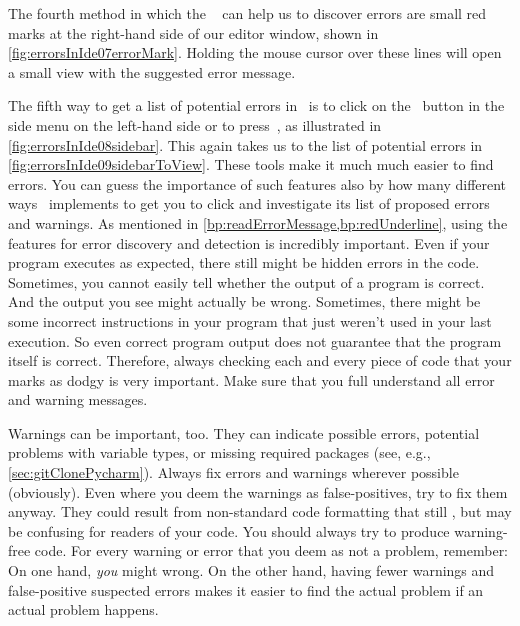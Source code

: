 The fourth method in which the \pycharm\  can help us to discover errors are small red marks at the right-hand side of our editor window, shown in \cref{fig:errorsInIde07errorMark}.
Holding the mouse cursor over these lines will open a small view with the suggested error message.

The fifth way to get a list of potential errors in \pycharm\ is to click on the \pycharmErrorsButton~button in the side menu on the left-hand side or to press~, as illustrated in \cref{fig:errorsInIde08sidebar}.
This again takes us to the list of potential errors in \cref{fig:errorsInIde09sidebarToView}.
%
%
%
These tools make it much much easier to find errors.
You can guess the importance of such features also by how many different ways \pycharm\ implements to get you to click and investigate its list of proposed errors and warnings.
As mentioned in \cref{bp:readErrorMessage,bp:redUnderline}, using the  features for error discovery and detection is incredibly important.
Even if your program executes as expected, there still might be hidden errors in the code.
Sometimes, you cannot easily tell whether the output of a program is correct.
And the output you see might actually be wrong.
Sometimes, there might be some incorrect instructions in your program that just weren't used in your last execution.
So even correct program output does not guarantee that the program itself is correct.
Therefore, always checking each and every piece of code that your  marks as dodgy is very important.
Make sure that you full understand all error and warning messages.

Warnings can be important, too.
They can indicate possible errors, potential problems with variable types, or missing required packages (see, e.g., \cref{sec:gitClonePycharm}).
Always fix errors and warnings wherever possible (obviously).
Even where you deem the warnings as false-positives, try to fix them anyway.
They could result from non-standard code formatting that still , but may be confusing for readers of your code.
You should always try to produce warning-free code.
For every warning or error that you deem as not a problem, remember:
On one hand, \emph{you} might wrong.
On the other hand, having fewer warnings and false-positive suspected errors makes it easier to find the actual problem if an actual problem happens.%
%
\FloatBarrier%
\endhsection%
%
